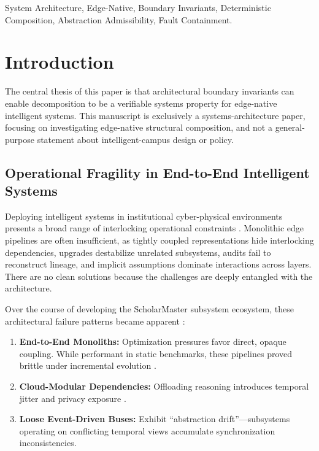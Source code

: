 \documentclass[conference]{IEEEtran}
\begin{document}
\begin{IEEEkeywords}
System Architecture, Edge-Native, Boundary Invariants, Deterministic Composition, Abstraction Admissibility, Fault Containment.
\end{IEEEkeywords}

\section{Introduction}

The central thesis of this paper is that architectural boundary invariants can enable decomposition to be a verifiable systems property for edge-native intelligent systems. This manuscript is exclusively a systems-architecture paper, focusing on investigating edge-native structural composition, and not a general-purpose statement about intelligent-campus design or policy.

\subsection{Operational Fragility in End-to-End Intelligent Systems}
Deploying intelligent systems in institutional cyber-physical environments \cite{b1, b5, b14, b15, b24, b26} presents a broad range of interlocking operational constraints \cite{b6, b21}. Monolithic edge pipelines are often insufficient, as tightly coupled representations hide interlocking dependencies, upgrades destabilize unrelated subsystems, audits fail to reconstruct lineage, and implicit assumptions dominate interactions across layers. There are no clean solutions because the challenges are deeply entangled with the architecture.

Over the course of developing the ScholarMaster subsystem ecosystem, these architectural failure patterns became apparent \cite{b2, b13, b16}:
\begin{enumerate}
    \item \textbf{End-to-End Monoliths:} Optimization pressures favor direct, opaque coupling. While performant in static benchmarks, these pipelines proved brittle under incremental evolution \cite{b17, b23}.
    \item \textbf{Cloud-Modular Dependencies:} Offloading reasoning introduces temporal jitter and privacy exposure \cite{b3, b18}.
    \item \textbf{Loose Event-Driven Buses:} Exhibit ``abstraction drift''---subsystems operating on conflicting temporal views accumulate synchronization inconsistencies.
\end{enumerate}
\end{document}
